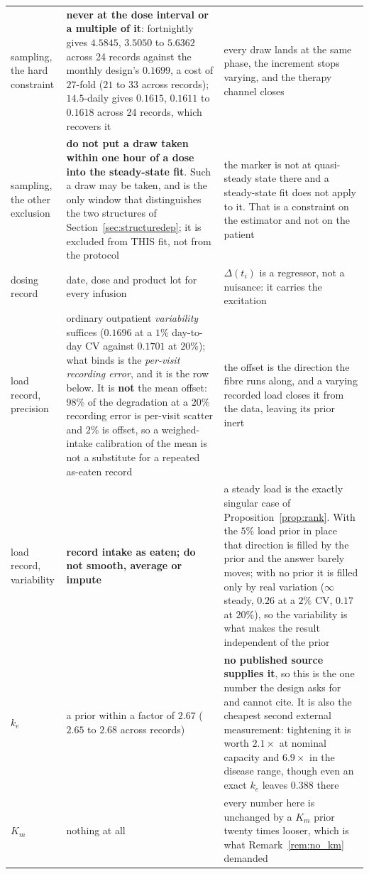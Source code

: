 \begin{tabular}{@{}>{\raggedright\arraybackslash}p{}@{\hskip 0.8em}>{\raggedright\arraybackslash}p{}@{\hskip 0.8em}>{\raggedright\arraybackslash}p{}@{}}
sampling, the hard constraint & \textbf{never at the dose interval or a multiple of it}: fortnightly gives $4.5845$, $3.5050$ to $5.6362$ across 24 records against the monthly design's $0.1699$, a cost of $27$-fold ($21$ to $33$ across records); $14.5$-daily gives $0.1615$, $0.1611$ to $0.1618$ across 24 records, which recovers it & every draw lands at the same phase, the increment stops varying, and the therapy channel closes \\
sampling, the other exclusion & \textbf{do not put a draw taken within one hour of a dose into the steady-state fit}. Such a draw may be taken, and is the only window that distinguishes the two structures of Section~\ref{sec:structuredep}; it is excluded from THIS fit, not from the protocol & the marker is not at quasi-steady state there and a steady-state fit does not apply to it. That is a constraint on the estimator and not on the patient \\
dosing record & date, dose and product lot for every infusion & $\Delta(t_i)$ is a regressor, not a nuisance: it carries the excitation \\
load record, precision & ordinary outpatient \emph{variability} suffices ($0.1696$ at a $1\%$ day-to-day CV against $0.1701$ at $20\%$); what binds is the \emph{per-visit recording error}, and it is the row below. It is \textbf{not} the mean offset: $98\%$ of the degradation at a $20\%$ recording error is per-visit scatter and $2\%$ is offset, so a weighed-intake calibration of the mean is not a substitute for a repeated as-eaten record & the offset is the direction the fibre runs along, and a varying recorded load closes it from the data, leaving its prior inert \\
load record, variability & \textbf{record intake as eaten; do not smooth, average or impute} & a steady load is the exactly singular case of Proposition~\ref{prop:rank}. With the $5\%$ load prior in place that direction is filled by the prior and the answer barely moves; with no prior it is filled only by real variation ($\infty$ steady, $0.26$ at a $2\%$ CV, $0.17$ at $20\%$), so the variability is what makes the result independent of the prior \\
$k_e$ & a prior within a factor of $2.67$ ($2.65$ to $2.68$ across records) & \textbf{no published source supplies it}, so this is the one number the design asks for and cannot cite. It is also the cheapest second external measurement: tightening it is worth $2.1\times$ at nominal capacity and $6.9\times$ in the disease range, though even an exact $k_e$ leaves $0.388$  there \\
$K_m$ & nothing at all & every number here is unchanged by a $K_m$ prior twenty times looser, which is what Remark~\ref{rem:no_km} demanded \\
\bottomrule
\end{tabular}
